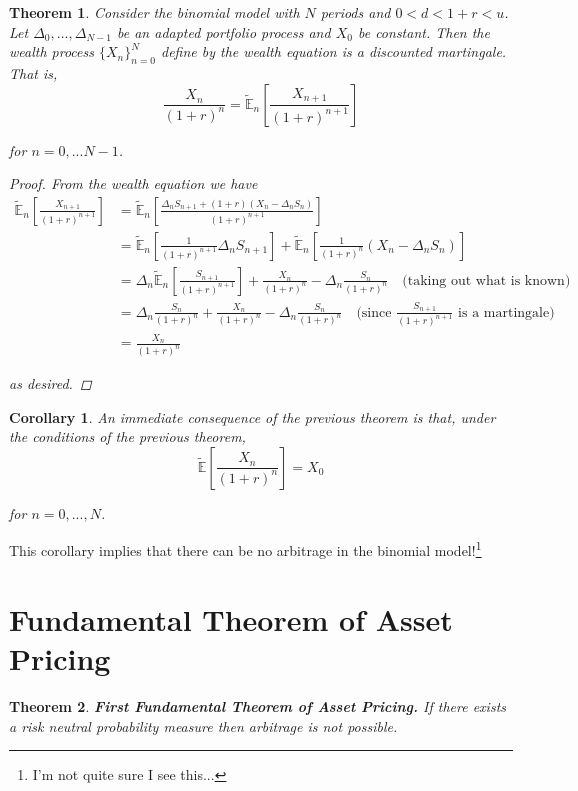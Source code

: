 \documentclass[12pt]{article}
\newtheorem{corollary}{Corollary}
\newtheorem{theorem}{Theorem}
\newcommand{\E}{\mathbb E}
\begin{document}
\begin{theorem} Consider the binomial model with $N$ periods and $0 < d < 1 + r < u$. Let $\Delta_0,..., \Delta_{N - 1}$ be an adapted portfolio process and $X_0$ be constant. Then the wealth process $\{X_n\}_{n = 0}^N$ define by the wealth equation is a discounted martingale. That is,
\begin{equation*}
	\frac{X_n}{(1 + r)^n} = \tilde{\E}_n \left[ \frac{X_{n + 1}}{(1 + r)^{n + 1}} \right]
\end{equation*}

for $n = 0, ... N - 1$.

\begin{proof} From the wealth equation we have
\begin{align*}
	\tilde{\E}_n \left[ \frac{X_{n + 1}}{(1 + r)^{n + 1}} \right] &= \tilde{\E}_n \left[ \frac{\Delta_nS_{n + 1} + (1 + r)(X_n - \Delta_nS_n)}{(1 + r)^{n + 1}} \right] \\
	&= \tilde{\E}_n \left[ \frac{1}{(1 + r)^{n + 1}} \Delta_nS_{n + 1} \right] + \tilde{\E}_n \left[ \frac{1}{(1 + r)^n} (X_n - \Delta_nS_n) \right] \\
	&= \Delta_n \tilde{\E}_n \left[ \frac{S_{n + 1}}{(1 + r)^{n + 1}} \right] + \frac{X_n}{(1 + r)^n} - \Delta_n \frac{S_n}{(1 + r)^n} \quad \text{(taking out what is known)} \\
	&= \Delta_n \frac{S_n}{(1 + r)^n} + \frac{X_n}{(1 + r)^n} - \Delta_n \frac{S_n}{(1 + r)^n} \quad \text{(since $\frac{S_{n + 1}}{(1 + r)^{n + 1}}$ is a martingale)} \\
	&= \frac{X_n}{(1 + r)^n}
\end{align*}

as desired.
\end{proof}
\end{theorem}

\begin{corollary} An immediate consequence of the previous theorem is that, under the conditions of the previous theorem,
\begin{equation*}
	\tilde{\E}\left[ \frac{X_n}{(1 + r)^n} \right] = X_0
\end{equation*}

for $n = 0,..., N$.
\end{corollary}

This corollary implies that there can be no arbitrage in the binomial model!\footnote{I'm not quite sure I see this...}

\section{Fundamental Theorem of Asset Pricing}

\begin{theorem} {\bf First Fundamental Theorem of Asset Pricing.} If there exists a risk neutral probability measure then arbitrage is not possible.
\end{theorem}
\end{document}
